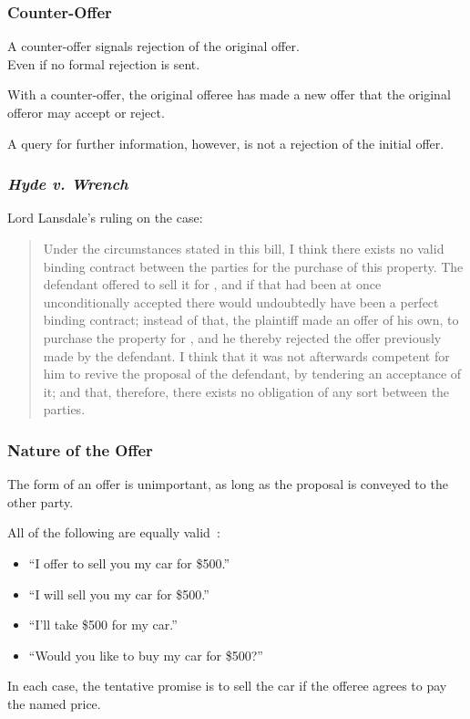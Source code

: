 \begin{frame}
\frametitle{Counter-Offer}

A counter-offer signals rejection of the original offer.\\
\quad Even if no formal rejection is sent.

With a counter-offer, the original offeree has made a new offer that the original offeror may accept or reject.

A query for further information, however, is not a rejection of the initial offer.

\end{frame}



\begin{frame}
\frametitle{\textit{Hyde v. Wrench}}

Lord Lansdale's ruling on the case:

\begin{quote}
Under the circumstances stated in this bill, I think there exists no valid binding contract between the parties for the purchase of this property. The defendant offered to sell it for , and if that had been at once unconditionally accepted there would undoubtedly have been a perfect binding contract; instead of that, the plaintiff made an offer of his own, to purchase the property for , and he thereby rejected the offer previously made by the defendant. I think that it was not afterwards competent for him to revive the proposal of the defendant, by tendering an acceptance of it; and that, therefore, there exists no obligation of any sort between the parties.
\end{quote}


\end{frame}



\begin{frame}
\frametitle{Nature of the Offer}

The form of an offer is unimportant, as long as the proposal is conveyed to the other party.

All of the following are equally valid~\cite{lba}:

\begin{itemize}
	\item ``I offer to sell you my car for \$500.''
	\item ``I will sell you my car for \$500.''
	\item ``I'll take \$500 for my car.''
	\item ``Would you like to buy my car for \$500?''
\end{itemize}

In each case, the tentative promise is to sell the car if the offeree agrees to pay the named price.

\end{frame}




